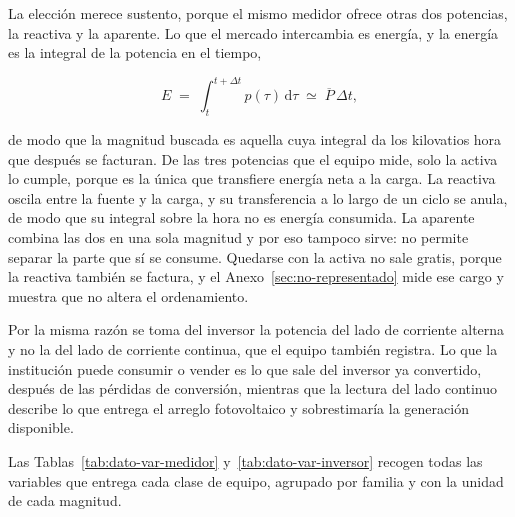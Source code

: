 La elección merece sustento, porque el mismo medidor ofrece otras dos
potencias, la reactiva y la aparente. Lo que el mercado intercambia es
energía, y la energía es la integral de la potencia en el tiempo,

\begin{equation}
 E \;=\; \int_{t}^{t+\Delta t} p(\tau)\,\mathrm{d}\tau
   \;\simeq\; \overline{P}\,\Delta t,
 \label{eq:dato-energia}
\end{equation}

de modo que la magnitud buscada es aquella cuya integral da los kilovatios
hora que después se facturan. De las tres potencias que el equipo mide,
solo la activa lo cumple, porque es la única que transfiere energía neta a
la carga. La reactiva oscila entre la fuente y la carga, y su
transferencia a lo largo de un ciclo se anula, de modo que su integral
sobre la hora no es energía consumida. La aparente combina las dos en una
sola magnitud y por eso tampoco sirve: no permite separar la parte que sí
se consume. Quedarse con la activa no sale gratis, porque la reactiva
también se factura, y el Anexo~\ref{sec:no-representado} mide ese cargo y
muestra que no altera el ordenamiento.

Por la misma razón se toma del inversor la potencia del lado de corriente
alterna y no la del lado de corriente continua, que el equipo también
registra. Lo que la institución puede consumir o vender es lo que sale del
inversor ya convertido, después de las pérdidas de conversión, mientras
que la lectura del lado continuo describe lo que entrega el arreglo
fotovoltaico y sobrestimaría la generación disponible.

Las Tablas~\ref{tab:dato-var-medidor} y~\ref{tab:dato-var-inversor} recogen todas las variables que entrega cada clase de equipo, agrupado por
familia y con la unidad de cada magnitud.

